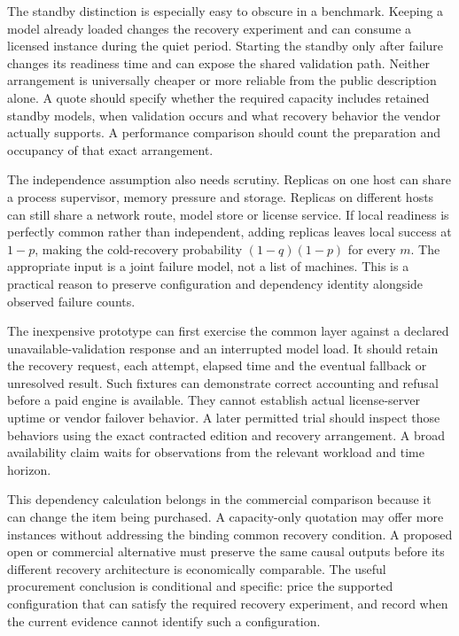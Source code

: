 The standby distinction is especially easy to obscure in a benchmark.
Keeping a model already loaded changes the recovery experiment and can consume
a licensed instance during the quiet period. Starting the standby only after
failure changes its readiness time and can expose the shared validation path.
Neither arrangement is universally cheaper or more reliable from the public
description alone. A quote should specify whether the required capacity
includes retained standby models, when validation occurs and what recovery
behavior the vendor actually supports. A performance comparison should count
the preparation and occupancy of that exact arrangement.

The independence assumption also needs scrutiny. Replicas on one host can
share a process supervisor, memory pressure and storage. Replicas on different
hosts can still share a network route, model store or license service. If local
readiness is perfectly common rather than independent, adding replicas leaves
local success at $1-p$, making the cold-recovery probability $(1-q)(1-p)$
for every $m$. The appropriate input is a joint failure model, not a list of
machines. This is a practical reason to preserve configuration and dependency
identity alongside observed failure counts.

The inexpensive prototype can first exercise the common layer against a
declared unavailable-validation response and an interrupted model load. It
should retain the recovery request, each attempt, elapsed time and the eventual
fallback or unresolved result. Such fixtures can demonstrate correct accounting
and refusal before a paid engine is available. They cannot establish actual
license-server uptime or vendor failover behavior. A later permitted trial
should inspect those behaviors using the exact contracted edition and recovery
arrangement. A broad availability claim waits for observations from the relevant
workload and time horizon.

This dependency calculation belongs in the commercial comparison because it
can change the item being purchased. A capacity-only quotation may offer more
instances without addressing the binding common recovery condition. A proposed
open or commercial alternative must preserve the same causal outputs before
its different recovery architecture is economically comparable. The useful
procurement conclusion is conditional and specific: price the supported
configuration that can satisfy the required recovery experiment, and record
when the current evidence cannot identify such a configuration.


